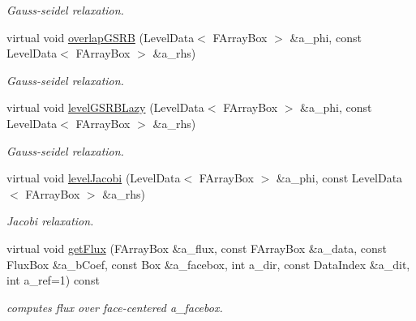 \begin{DoxyCompactItemize}
\begin{DoxyCompactList}\small\item\em Gauss-\/seidel relaxation. \end{DoxyCompactList}\item 
\hypertarget{class_a_m_r_non_linear_multi_comp_op_a123577c271aa45f550fbc159b03a144c}{virtual void \hyperlink{class_a_m_r_non_linear_multi_comp_op_a123577c271aa45f550fbc159b03a144c}{overlap\-G\-S\-R\-B} (Level\-Data$<$ F\-Array\-Box $>$ \&a\-\_\-phi, const Level\-Data$<$ F\-Array\-Box $>$ \&a\-\_\-rhs)}\label{class_a_m_r_non_linear_multi_comp_op_a123577c271aa45f550fbc159b03a144c}

\begin{DoxyCompactList}\small\item\em Gauss-\/seidel relaxation. \end{DoxyCompactList}\item 
\hypertarget{class_a_m_r_non_linear_multi_comp_op_a301f4fedc4fed7a13e914d5f26f8d719}{virtual void \hyperlink{class_a_m_r_non_linear_multi_comp_op_a301f4fedc4fed7a13e914d5f26f8d719}{level\-G\-S\-R\-B\-Lazy} (Level\-Data$<$ F\-Array\-Box $>$ \&a\-\_\-phi, const Level\-Data$<$ F\-Array\-Box $>$ \&a\-\_\-rhs)}\label{class_a_m_r_non_linear_multi_comp_op_a301f4fedc4fed7a13e914d5f26f8d719}

\begin{DoxyCompactList}\small\item\em Gauss-\/seidel relaxation. \end{DoxyCompactList}\item 
\hypertarget{class_a_m_r_non_linear_multi_comp_op_a7fd508a366d0e779e8ac82ca7f03ec69}{virtual void \hyperlink{class_a_m_r_non_linear_multi_comp_op_a7fd508a366d0e779e8ac82ca7f03ec69}{level\-Jacobi} (Level\-Data$<$ F\-Array\-Box $>$ \&a\-\_\-phi, const Level\-Data$<$ F\-Array\-Box $>$ \&a\-\_\-rhs)}\label{class_a_m_r_non_linear_multi_comp_op_a7fd508a366d0e779e8ac82ca7f03ec69}

\begin{DoxyCompactList}\small\item\em Jacobi relaxation. \end{DoxyCompactList}\item 
\hypertarget{class_a_m_r_non_linear_multi_comp_op_aa97fbc9429f251b8d61722652547822f}{virtual void \hyperlink{class_a_m_r_non_linear_multi_comp_op_aa97fbc9429f251b8d61722652547822f}{get\-Flux} (F\-Array\-Box \&a\-\_\-flux, const F\-Array\-Box \&a\-\_\-data, const Flux\-Box \&a\-\_\-b\-Coef, const Box \&a\-\_\-facebox, int a\-\_\-dir, const Data\-Index \&a\-\_\-dit, int a\-\_\-ref=1) const }\label{class_a_m_r_non_linear_multi_comp_op_aa97fbc9429f251b8d61722652547822f}

\begin{DoxyCompactList}\small\item\em computes flux over face-\/centered a\-\_\-facebox. \end{DoxyCompactList}\end{DoxyCompactItemize}
